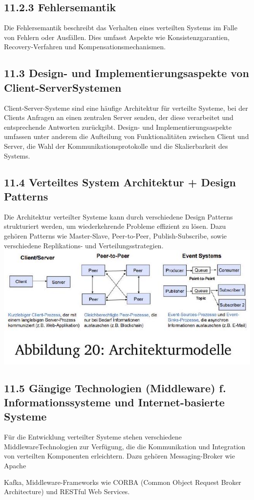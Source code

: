 \subsection*{11.2.3 Fehlersemantik}
Die Fehlersemantik beschreibt das Verhalten eines verteilten Systems im Falle von Fehlern oder Ausfällen. Dies umfasst Aspekte wie Konsistenzgarantien, Recovery-Verfahren und Kompensationsmechanismen.

\subsection*{11.3 Design- und Implementierungsaspekte von Client-ServerSystemen}
Client-Server-Systeme sind eine häufige Architektur für verteilte Systeme, bei der Clients Anfragen an einen zentralen Server senden, der diese verarbeitet und entsprechende Antworten zurückgibt. Design- und Implementierungsaspekte umfassen unter anderem die Aufteilung von Funktionalitäten zwischen Client und Server, die Wahl der Kommunikationsprotokolle und die Skalierbarkeit des Systems.

\subsection*{11.4 Verteiltes System Architektur + Design Patterns}
Die Architektur verteilter Systeme kann durch verschiedene Design Patterns strukturiert werden, um wiederkehrende Probleme effizient zu lösen. Dazu gehören Patterns wie Master-Slave, Peer-to-Peer, Publish-Subscribe, sowie verschiedene Replikations- und Verteilungsstrategien.\\
\includegraphics[width=\linewidth]{images/2024_12_29_0d1d7b5551ea1b4b41bdg-18}

\subsection*{11.5 Gängige Technologien (Middleware) f. Informationssysteme und Internet-basierte Systeme}
Für die Entwicklung verteilter Systeme stehen verschiedene MiddlewareTechnologien zur Verfügung, die die Kommunikation und Integration von verteilten Komponenten erleichtern. Dazu gehören Messaging-Broker wie Apache

Kafka, Middleware-Frameworks wie CORBA (Common Object Request Broker Architecture) und RESTful Web Services.


